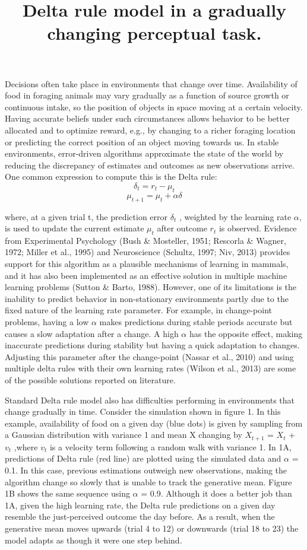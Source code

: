\documentclass[jou,apacite]{apa6}
\title{Delta rule model in a gradually changing perceptual task.}
\begin{document}
\maketitle    
Decisions often take place in environments that change over time. Availability of food in foraging animals may vary gradually as a function of source growth or continuous intake, so the position of objects in space moving at a certain velocity. Having accurate beliefs under such circumstances allows behavior to be better allocated and to optimize reward, e.g., by changing to a richer foraging location or predicting the correct position of an object moving towards us. In stable environments, error-driven algorithms approximate the state of the world by reducing the discrepancy of estimates and outcomes as new observations arrive. One common expression to compute this is the Delta rule: $$\delta_t = r_t - \mu_t$$
\begin{equation}
\mu_{t+1} = \mu_t + \alpha\delta
\end{equation}

where, at a given trial t, the prediction error $\delta_t$ , weighted by the learning rate $\alpha$, is used to update the current estimate $\mu_t$ after outcome $r_t$  is observed. Evidence from Experimental Psychology (Bush \& Mosteller, 1951; Rescorla \& Wagner, 1972; Miller et al., 1995) and Neuroscience (Schultz, 1997; Niv, 2013) provides support for this algorithm as a plausible mechanisms of learning in mammals, and it has also been implemented as an effective solution in multiple machine learning problems (Sutton \& Barto, 1988). However, one of its limitations is the inability to predict behavior in non-stationary environments partly due to the fixed nature of the learning rate parameter. For example, in change-point problems, having a low $\alpha$ makes predictions during stable periods accurate but causes a slow adaptation after a change. A high $\alpha$ has the opposite effect, making inaccurate predictions during stability but having a quick adaptation to changes. Adjusting this parameter after the change-point (Nassar et al., 2010) and using multiple delta rules with their own learning rates (Wilson et al., 2013) are some of the possible solutions reported on literature.  

Standard Delta rule model also has difficulties performing in environments that change gradually in time.  Consider the simulation shown in figure 1.  In this example, availability of food on a given day (blue dots) is given by sampling from a Gaussian distribution with variance 1 and mean X changing by $X_{t+1}$ = $X_t$ + $v_t$ ,where $v_t$  is a velocity term following a random walk with variance 1. In 1A, predictions of Delta rule (red line) are plotted using the simulated data and $\alpha$ = 0.1. In this case, previous estimations outweigh new observations, making the algorithm change so slowly that is unable to track the generative mean. Figure 1B shows the same sequence using $\alpha$ = 0.9. Although it does a better job than 1A, given the high learning rate, the Delta rule predictions on a given day resemble the just-perceived outcome the day before. As a result, when the generative mean moves upwards (trial 4 to 12) or downwards (trial 18 to 23) the model adapts as though it were one step behind. 
\end{document}
